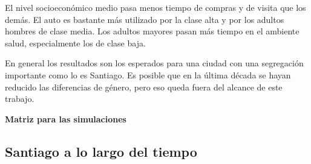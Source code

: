 El nivel socioeconómico medio pasa menos tiempo de compras y de visita que los demás. El auto es bastante más utilizado por la clase alta y por los adultos hombres de clase media. Los adultos mayores pasan más tiempo en el ambiente salud, especialmente los de clase baja.

En general los resultados son los esperados para una ciudad con una segregación importante como lo es Santiago. Es posible que en la última década se hayan reducido las diferencias de género, pero eso queda fuera del alcance de este trabajo.


\noindent \textbf{Matriz para las simulaciones}


\subsection{Santiago a lo largo del tiempo}
